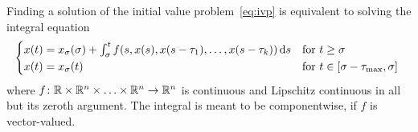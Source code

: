     \begin{lemma}\label{lm:integral-equation}
        Finding a solution of the initial value problem~\eqref{eq:ivp} is equivalent to solving the integral equation
        \begin{equation*}\label{eq:integral-equation}
            \normalfont
            \begin{cases*}
                x(t) = x_{\tzero}(\tzero) + \integral{\tzero}{t} f(s,x(s),x(s-\tau_1),\ldots,x(s-\tau_k))\dx[s] & for $t\geq\tzero$\\
                x(t) = x_{\tzero}(t) & for $t\in\compactum{\tzero-\taumax}{\tzero}$
            \end{cases*}
        \end{equation*}
        where $f\colon\mathbb{R}\times\mathbb{R}^n\times\ldots\times\mathbb{R}^n\to\mathbb{R}^n$ is continuous
        and Lipschitz continuous in all but its zeroth argument.
        The integral is meant to be componentwise, if $f$ is vector-valued.
    \end{lemma}
